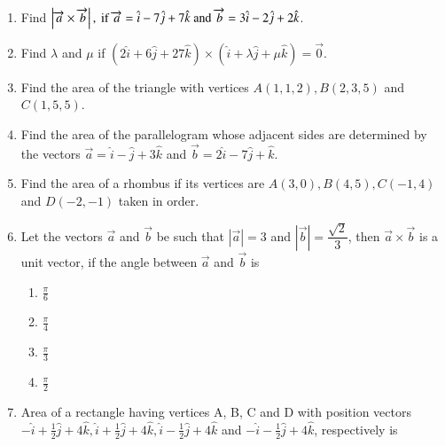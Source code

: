 \begin{enumerate}[label=\thesubsection.\arabic*,ref=\thesubsection.\theenumi]
		\item Find $\left\vert\overrightarrow{a}\times\overrightarrow{b}\right\vert,\text{ if }\overrightarrow{a}=\hat{i}-7\hat{j}+7\hat{k}\text{ and } \overrightarrow{b}=3\hat{i}-2\hat{j}+2\hat{k}$.
	\\
		\solution
		
\item Find $\lambda$ and $\mu$ if $(2\hat{i}+6\hat{j}+27\hat{k})\times(\hat{i}+\lambda \hat{j} + \mu \hat{k})=\overrightarrow{0}$.
	\\
		\solution
		
\item Find the area of the triangle with vertices $A(1, 1, 2), B(2, 3, 5)$ and $C(1, 5, 5)$.
	\\
		\solution
		
\item Find the area of the parallelogram whose adjacent sides are determined by the vectors $\overrightarrow{a}=\hat{i}-\hat{j}+3\hat{k}$ and $\overrightarrow{b}=2\hat{i}-7\hat{j}+\hat{k}$.
	\\
		\solution
		
\item Find the area of a rhombus if its vertices are $A(3,0), B(4,5), C(-1,4)$  and  $D(-2,-1)$ taken in order. 
	\\
		\solution
	
\item Let the vectors $\overrightarrow{a}$ and $\overrightarrow{b}$ be such that $|\overrightarrow{a}| = 3$ and $|\overrightarrow{b}| = \dfrac{\sqrt{2}}{3}$, then $\overrightarrow{a} \times \overrightarrow{b}$ is a unit vector, if the angle between $\overrightarrow{a}$ and $\overrightarrow{b}$ is
	\begin{multicols}{2}
	\begin{enumerate}
\item $\frac{\pi}{6}$
\item $\frac{\pi}{4}$
\item $\frac{\pi}{3}$
\item $\frac{\pi}{2}$
\end{enumerate}
	\end{multicols}
		\solution
		
\item Area of a rectangle having vertices A, B, C and D with position vectors $ -\hat{i}+ \frac{1}{2} \hat{j}+4\hat{k}, \hat{i}+ \frac{1}{2} \hat{j}+4\hat{k}, \hat{i}-\frac{1}{2} \hat{j}+4\hat{k}$ and $-\hat{i}- \frac{1}{2} \hat{j}+4\hat{k}$, respectively is

\end{enumerate}

